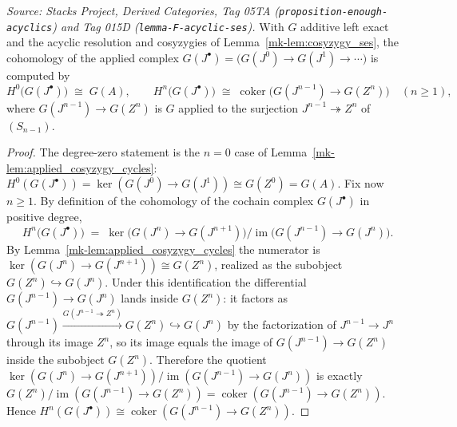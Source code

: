 \begin{lemma}
  \label{mk-lem:cohomology_of_applied_resolution}
  \lean{}

  \textit{Source: Stacks Project, Derived Categories, Tag 05TA
  (\texttt{proposition-enough-acyclics}) and Tag 015D
  (\texttt{lemma-F-acyclic-ses}).}
  With \(G\) additive left exact and the acyclic resolution and cosyzygies of
  Lemma~\ref{mk-lem:cosyzygy_ses}, the cohomology of the applied complex
  \(G(J^\bullet) = \bigl(G(J^0) \to G(J^1) \to \cdots\bigr)\) is computed by
  \[
    H^0\bigl(G(J^\bullet)\bigr) \;\cong\; G(A),
    \qquad
    H^n\bigl(G(J^\bullet)\bigr) \;\cong\;
      \operatorname{coker}\bigl(G(J^{n-1}) \to G(Z^n)\bigr) \quad (n \geq 1),
  \]
  where \(G(J^{n-1}) \to G(Z^n)\) is \(G\) applied to the surjection
  \(J^{n-1} \twoheadrightarrow Z^n\) of \((S_{n-1})\).
\end{lemma}

\begin{proof}
  The degree-zero statement is the \(n = 0\) case of
  Lemma~\ref{mk-lem:applied_cosyzygy_cycles}: \(H^0(G(J^\bullet)) = \ker(G(J^0) \to G(J^1))
  \cong G(Z^0) = G(A)\). Fix now \(n \geq 1\). By definition of the cohomology of the
  cochain complex \(G(J^\bullet)\) in positive degree,
  \[
    H^n\bigl(G(J^\bullet)\bigr)
      \;=\; \ker\bigl(G(J^n) \to G(J^{n+1})\bigr) \big/
            \operatorname{im}\bigl(G(J^{n-1}) \to G(J^n)\bigr).
  \]
  By Lemma~\ref{mk-lem:applied_cosyzygy_cycles} the numerator is
  \(\ker(G(J^n) \to G(J^{n+1})) \cong G(Z^n)\), realized as the subobject
  \(G(Z^n) \hookrightarrow G(J^n)\). Under this identification the differential
  \(G(J^{n-1}) \to G(J^n)\) lands inside \(G(Z^n)\): it factors as
  \(G(J^{n-1}) \xrightarrow{G(J^{n-1} \twoheadrightarrow Z^n)} G(Z^n)
  \hookrightarrow G(J^n)\) by the factorization of \(J^{n-1} \to J^n\) through its image
  \(Z^n\), so its image equals the image of \(G(J^{n-1}) \to G(Z^n)\) inside the
  subobject \(G(Z^n)\). Therefore the quotient
  \(\ker(G(J^n) \to G(J^{n+1})) / \operatorname{im}(G(J^{n-1}) \to G(J^n))\) is exactly
  \(G(Z^n) / \operatorname{im}(G(J^{n-1}) \to G(Z^n)) =
  \operatorname{coker}(G(J^{n-1}) \to G(Z^n))\). Hence
  \(H^n(G(J^\bullet)) \cong \operatorname{coker}(G(J^{n-1}) \to G(Z^n))\).
\end{proof}

